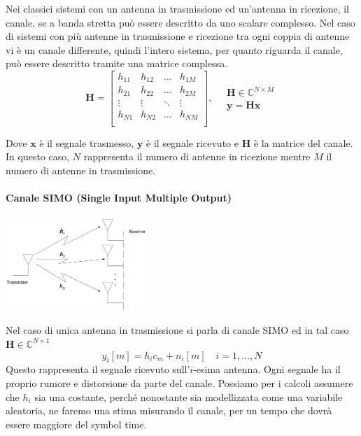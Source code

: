 Nei classici sistemi con un antenna in trasmissione ed un'antenna in ricezione, il canale, se a banda stretta può essere descritto da uno scalare complesso.
Nel caso di sistemi con più antenne in trasmissione e ricezione tra ogni coppia di antenne vi è un canale differente, quindi l'intero sistema, per quanto riguarda il canale, può essere descritto tramite una matrice complessa.
\[ 
    \mathbf{H} = 
    \begin{bmatrix}
        h_{11} & h_{12} & \ldots & h_{1M} \\
        h_{21} & h_{22} & \ldots & h_{2M} \\
        \vdots & \vdots & \ddots & \vdots \\
        h_{N1} & h_{N2} & \ldots & h_{NM} \\
    \end{bmatrix}
    , \quad
    \begin{array}{ll}
            \mathbf{H} \in \mathbb{C}^{N \times M} \\
            \mathbf{y} = \mathbf{Hx} 
    \end{array}
\]

Dove $\mathbf{x}$ è il segnale trasmesso, $\mathbf{y}$ è il segnale ricevuto e $\mathbf{H}$ è la matrice del canale. In questo caso, $N$ rappresenta il numero di antenne in ricezione mentre $M$ il numero di antenne in trasmissione.
\paragraph*{Canale SIMO (Single Input Multiple Output)}
\begin{center}
    \includegraphics[width=0.4\textwidth]{imgs/simo.jpg}
\end{center}
Nel caso di unica antenna in trasmissione si parla di canale SIMO ed in tal caso $\mathbf{H} \in \mathbb{C}^{N \times 1}$
\[
    y_i[m] = h_i c_m + n_i[m] \quad i = 1, \ldots, N
\]
Questo rappresenta il segnale ricevuto sull'$i$-esima antenna.
Ogni segnale ha il proprio rumore e distorsione da parte del canale.
Possiamo per i calcoli assumere che $h_i$ sia una costante, perché nonostante sia modellizzata come una variabile aleatoria, ne faremo una stima misurando il canale, per un tempo che dovrà essere maggiore del symbol time.

